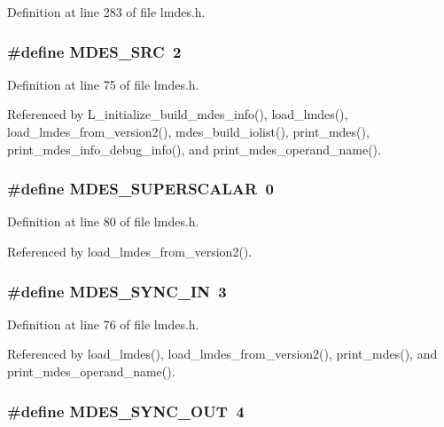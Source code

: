 Definition at line 283 of file lmdes.h.
\subsubsection{\setlength{\rightskip}{0pt plus 5cm}\#define MDES\_\-SRC~2}\label{lmdes_8h_d6662cf14c3f61ef04bbfa00fa496bba}




Definition at line 75 of file lmdes.h.

Referenced by L\_\-initialize\_\-build\_\-mdes\_\-info(), load\_\-lmdes(), load\_\-lmdes\_\-from\_\-version2(), mdes\_\-build\_\-iolist(), print\_\-mdes(), print\_\-mdes\_\-info\_\-debug\_\-info(), and print\_\-mdes\_\-operand\_\-name().
\subsubsection{\setlength{\rightskip}{0pt plus 5cm}\#define MDES\_\-SUPERSCALAR~0}\label{lmdes_8h_2202ce53709c0e408a63030c29fead58}




Definition at line 80 of file lmdes.h.

Referenced by load\_\-lmdes\_\-from\_\-version2().
\subsubsection{\setlength{\rightskip}{0pt plus 5cm}\#define MDES\_\-SYNC\_\-IN~3}\label{lmdes_8h_68139cefe2a913e6bf58ee671e70e620}




Definition at line 76 of file lmdes.h.

Referenced by load\_\-lmdes(), load\_\-lmdes\_\-from\_\-version2(), print\_\-mdes(), and print\_\-mdes\_\-operand\_\-name().
\subsubsection{\setlength{\rightskip}{0pt plus 5cm}\#define MDES\_\-SYNC\_\-OUT~4}\label{lmdes_8h_8d186a9d28efc70dbedced22702e23f8}




